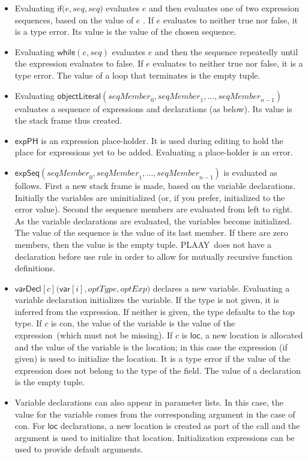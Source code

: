 \documentclass[12pt]{article}
\begin{document}
\begin{itemize}
\item Evaluating $\mathsf{if}(e,\mathit{seq},\mathit{seq)}$ evaluates $e$
and then evaluates one of two expression sequences, based on the value of $e$%
. If $e$ evaluates to neither true nor false, it is a type error. Its value
is the value of the chosen sequence.

\item Evaluating $\mathsf{while}\left( e,\mathit{seq}\right) $ evaluates $e$
and then the sequence repeatedly until the expression evaluates to false. 
If $e$ evaluates to neither true nor false, it is a type error. The value of
a loop that terminates is the empty tuple.

\item Evaluating $\mathsf{objectLiteral}\left( \mathit{seqMember}_{0},%
\mathit{seqMember}_{1},\ldots ,\mathit{seqMember}_{n-1}\right) $ evaluates a
sequence of expressions and declarations (as below). Its value is the stack
frame thus created.

\item $\mathsf{expPH}$ is an expression place-holder. It is used during
editing to hold the place for expressions yet to be added. Evaluating a
place-holder is an error.

\item $\mathsf{expSeq}\left( \mathit{seqMember}_{0},\mathit{seqMember}%
_{1},\ldots ,\mathit{seqMember}_{n-1}\right) $ is evaluated as follows.
First a new stack frame is made, based on the variable declarations.
Initially the variables are uninitialized (or, if you prefer, initialized to
the error value). Second the sequence members are evaluated from left to
right. As the variable declarations are evaluated, the variables become
initialized. The value of the sequence is the value of its last member. If
there are zero members, then the value is the empty tuple. PLAAY\ does not
have a declaration before use rule in order to allow for mutually recursive
function definitions.

\item $\mathsf{varDecl}[c]\mathsf{(var}[i],\mathit{optType,optExp})$
declares a new variable. Evaluating a variable declaration initializes the
variable. If the type is not given, it is inferred from the expression. If
neither is given, the type defaults to the top type. If $c$ is \textsf{con},
the value of the variable is the value of the expression\ (which must not be
missing). If $c$ is $\mathsf{loc}$, a new location is allocated and the
value of the variable is the location; in this case the expression (if
given) is used to initialize the location. It is a type error if the value
of the expression does not belong to the type of the field. The value of a
declaration is the empty tuple.

\item Variable declarations can also appear in parameter lists. In this
case, the value for the variable comes from the corresponding argument in
the case of \textsf{con}. For $\mathsf{loc}$ declarations, a new location is
created as part of the call and the argument is used to initialize that
location. Initialization expressions can be used to provide default
arguments.
\end{itemize}
\end{document}
